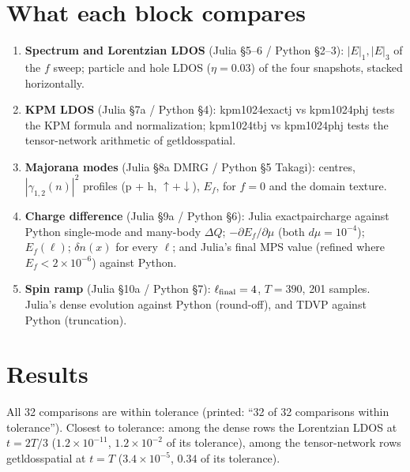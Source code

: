 \documentclass[11pt]{article}
\newcommand{\codeus}{\textunderscore\allowbreak}
\renewcommand{\code}[1]{{\ttfamily\let\_\codeus #1}}
\begin{document}
\section{What each block compares}

\begin{enumerate}
\item \textbf{Spectrum and Lorentzian LDOS} (Julia §5–6 / Python §2–3): $|E|_1,|E|_3$ of the $f$ sweep; particle and hole LDOS ($\eta=0.03$) of the four snapshots, stacked horizontally.
\item \textbf{KPM LDOS} (Julia §7a / Python §4): \code{kpm1024\_exact\_j} vs \code{kpm1024\_ph\_j} tests the KPM formula and normalization; \code{kpm1024\_tb\_j} vs \code{kpm1024\_ph\_j} tests the tensor-network arithmetic of \code{get\_ldos\_spatial}.
\item \textbf{Majorana modes} (Julia §8a DMRG / Python §5 Takagi): centres, $|\gamma_{1,2}(n)|^2$ profiles (p + h, $\uparrow+\downarrow$), $E_f$, for $f=0$ and the domain texture.
\item \textbf{Charge difference} (Julia §9a / Python §6): Julia \code{exact\_pair\_charge} against Python single-mode and many-body $\Delta Q$; $-\partial E_f/\partial\mu$ (both $d\mu=10^{-4}$); $E_f(\ell)$; $\delta n(x)$ for every $\ell$; and Julia's final MPS value (refined where $E_f<2\times10^{-6}$) against Python.
\item \textbf{Spin ramp} (Julia §10a / Python §7): $\ell_{\rm final}=4$, $T=390$, 201 samples. Julia's dense evolution against Python (round-off), and TDVP against Python (truncation).
\end{enumerate}

\section{Results}

All 32 comparisons are within tolerance (printed: ``32 of 32 comparisons within tolerance''). Closest to tolerance: among the dense rows the
Lorentzian LDOS at $t=2T/3$ ($1.2\times10^{-11}$, $1.2\times10^{-2}$ of its tolerance), among the tensor-network rows \code{get\_ldos\_spatial} at
$t=T$ ($3.4\times10^{-5}$, $0.34$ of its tolerance).
\end{document}
